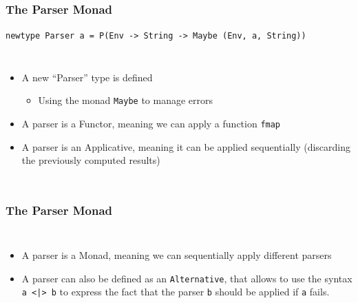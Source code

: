 \documentclass{beamer}
\begin{document}
\begin{frame}
	\frametitle{The Parser Monad}
	\begin{center}
		\lstinline{newtype Parser a = P(Env -> String -> Maybe (Env, a, String))}
	\end{center}
	\begin{columns}
		\footnotesize
		\begin{itemize}
			\item A new ``Parser'' type is defined
				\begin{itemize}
					\footnotesize
					\item Using the monad \lstinline|Maybe| to manage errors
				\end{itemize}
			\item A parser is a Functor, meaning we can apply a function
				\texttt{fmap}
			\item A parser is an Applicative, meaning it can be applied
				sequentially (discarding the previously computed results)
		\end{itemize}
		
		
	\end{columns}
\end{frame}

\begin{frame}
	\frametitle{The Parser Monad}
	\begin{columns}
		\column{0.3\textwidth}
		\footnotesize
		\begin{itemize}
			\item A parser is a Monad, meaning we can sequentially apply
				different parsers
			\item A parser can also be defined as an \texttt{Alternative}, that
				allows to use the syntax \lstinline{a <|> b} to express the
				fact that the parser \texttt{b} should be applied if \texttt{a}
				fails.
		\end{itemize}
		\column{0.65\textwidth}
		
		
	\end{columns}
\end{frame}
\end{document}
